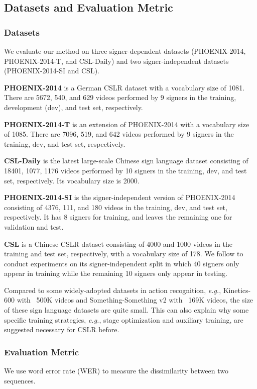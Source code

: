 \documentclass[acmsmall,screen]{acmart}
\def\eg{\emph{e.g.}} \def\Eg{\emph{E.g.}}
\def \tbf{\textbf}
\begin{document}
\subsection{Datasets and Evaluation Metric}
\subsubsection{Datasets}
We evaluate our method on three signer-dependent datasets (PHOENIX-2014, PHOENIX-2014-T, and CSL-Daily) and two signer-independent datasets (PHOENIX-2014-SI and CSL).

\tbf{PHOENIX-2014} \cite{2014} is a German CSLR dataset with a vocabulary size of 1081. There are 5672, 540, and 629 videos performed by 9 signers in the training, development (dev), and test set, respectively. 

\tbf{PHOENIX-2014-T} \cite{2014T} is an extension of PHOENIX-2014 with a vocabulary size of 1085. 
There are 7096, 519, and 642 videos performed by 9 signers in the training, dev, and test set, respectively. 

\tbf{CSL-Daily} \cite{zhou2021improving} is the latest large-scale Chinese sign language dataset consisting of 18401, 1077, 1176 videos performed by 10 signers in the training, dev, and test set, respectively. Its vocabulary size is 2000.

\tbf{PHOENIX-2014-SI} \cite{2014} is the signer-independent version of PHOENIX-2014 consisting of 4376, 111, and 180 videos in the training, dev, and test set, respectively. It has 8 signers for training, and leaves the remaining one for validation and test. 

\tbf{CSL} \cite{iopt, csl-2, csl-3} is a Chinese CSLR dataset consisting of 4000 and 1000 videos in the training and test set, respectively, with a vocabulary size of 178. 
We follow \cite{fcn, vac} to conduct experiments on its signer-independent split in which 40 signers only appear in training while the remaining 10 signers only appear in testing.

Compared to some widely-adopted datasets in action recognition, \eg, Kinetics-600 \cite{k600} with ~500K videos and Something-Something v2 \cite{sthsthv2} with ~169K videos, the size of these sign language datasets are quite small. This can also explain why some specific training strategies, \eg, stage optimization and auxiliary training, are suggested necessary for CSLR before.


\subsubsection{Evaluation Metric}
We use word error rate (WER) to measure the dissimilarity between two sequences.
\end{document}
